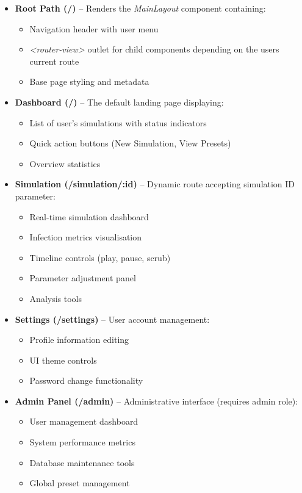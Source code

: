 \begin{itemize}
    \item \textbf{Root Path (/)} – Renders the \textit{MainLayout} component containing:
    \begin{itemize}
        \item Navigation header with user menu
        \item \textit{<router-view>} outlet for child components depending on the users current route
        \item Base page styling and metadata
    \end{itemize}
    
    \item \textbf{Dashboard (/)} – The default landing page displaying:
    \begin{itemize}
        \item List of user's simulations with status indicators
        \item Quick action buttons (New Simulation, View Presets)
        \item Overview statistics
    \end{itemize}
    
    \item \textbf{Simulation (/simulation/:id)} – Dynamic route accepting simulation ID parameter:
    \begin{itemize}
        \item Real-time simulation dashboard
        \item Infection metrics visualisation
        \item Timeline controls (play, pause, scrub)
        \item Parameter adjustment panel
        \item Analysis tools
    \end{itemize}
    
    \item \textbf{Settings (/settings)} – User account management:
    \begin{itemize}
        \item Profile information editing
        \item UI theme controls
        \item Password change functionality
    \end{itemize}
    
    \item \textbf{Admin Panel (/admin)} – Administrative interface (requires admin role):
    \begin{itemize}
        \item User management dashboard
        \item System performance metrics
        \item Database maintenance tools
        \item Global preset management
    \end{itemize}
\end{itemize}

